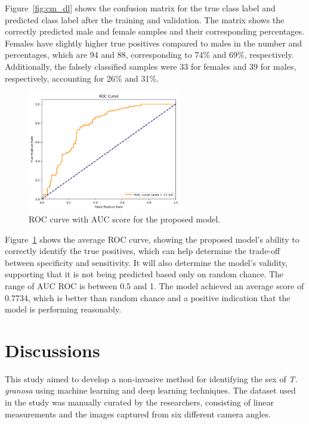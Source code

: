 Figure~\ref{fig:cm_dl} shows the confusion matrix for the true class label and predicted class label after the training and validation. The matrix shows the correctly predicted male and female samples and their corresponding percentages. Females have slightly higher true positives compared to males in the number and percentages, which are 94 and 88, corresponding to 74\% and 69\%, respectively. Additionally, the falsely classified samples were 33 for females and 39 for males, respectively, accounting for 26\% and 31\%.

\begin{figure}[!htbp]
	\centering
	\includegraphics[width=0.6\textwidth]{figures/roc.png}
	\caption{ROC curve with AUC score for the proposed model.}
	\label{fig:roc_auc}
\end{figure}

Figure~\ref{fig:roc_auc} shows the average ROC curve, showing the proposed model’s ability to correctly identify the true positives, which can help determine the trade-off between specificity and sensitivity. It will also determine the model's validity, supporting that it is not being predicted based only on random chance. The range of AUC ROC is between 0.5 and 1. The model achieved an average score of 0.7734, which is better than random chance and a positive indication that the model is performing reasonably.

\section{Discussions}

This study aimed to develop a non-invasive method for identifying the sex of \textit{T. granosa} using machine learning and deep learning techniques. The dataset used in the study was manually curated by the researchers, consisting of linear measurements and the images captured from six different camera angles.

